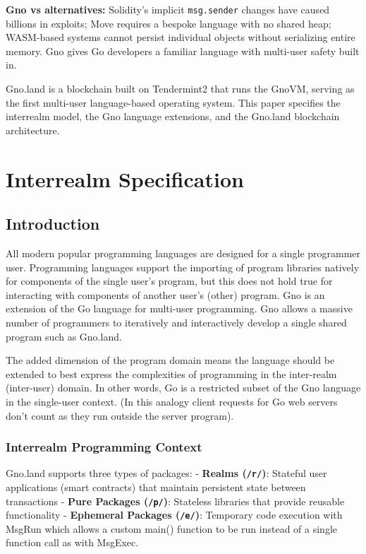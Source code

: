\documentclass[12pt,a4paper]{article}
\newcommand{\passthrough}[1]{#1}
\begin{document}
\textbf{Gno vs alternatives:} Solidity's implicit
\passthrough{\lstinline!msg.sender!} changes have caused billions in
exploits; Move requires a bespoke language with no shared heap;
WASM-based systems cannot persist individual objects without serializing
entire memory. Gno gives Go developers a familiar language with
multi-user safety built in.

Gno.land is a blockchain built on Tendermint2 that runs the GnoVM,
serving as the first multi-user language-based operating system. This
paper specifies the interrealm model, the Gno language extensions, and
the Gno.land blockchain architecture.

\newpage

\section{Interrealm Specification}\label{interrealm-specification}

\subsection{Introduction}\label{introduction}

All modern popular programming languages are designed for a single
programmer user. Programming languages support the importing of program
libraries natively for components of the single user's program, but this
does not hold true for interacting with components of another user's
(other) program. Gno is an extension of the Go language for multi-user
programming. Gno allows a massive number of programmers to iteratively
and interactively develop a single shared program such as Gno.land.

The added dimension of the program domain means the language should be
extended to best express the complexities of programming in the
inter-realm (inter-user) domain. In other words, Go is a restricted
subset of the Gno language in the single-user context. (In this analogy
client requests for Go web servers don't count as they run outside the
server program).

\subsubsection{Interrealm Programming
Context}\label{interrealm-programming-context}

Gno.land supports three types of packages: - \textbf{Realms
(\passthrough{\lstinline!/r/!})}: Stateful user applications (smart
contracts) that maintain persistent state between transactions -
\textbf{Pure Packages (\passthrough{\lstinline!/p/!})}: Stateless
libraries that provide reusable functionality - \textbf{Ephemeral
Packages (\passthrough{\lstinline!/e/!})}: Temporary code execution with
MsgRun which allows a custom main() function to be run instead of a
single function call as with MsgExec.
\end{document}
